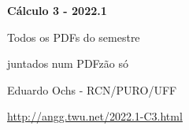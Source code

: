 \documentclass[oneside,12pt]{article}
\begin{document}

\def\u#1{\par{\footnotesize \url{#1}}}

\def\drafturl{http://angg.twu.net/LATEX/2022-1-C3.pdf}
\def\drafturl{http://angg.twu.net/2022.1-C3.html}
\def\draftfooter{\tiny \href{\drafturl}{\jobname{}} \ColorBrown{\shorttoday{} \hours}}



%

\thispagestyle{empty}

\begin{center}

\vspace*{1.2cm}

{\bf \Large Cálculo 3 - 2022.1}

\bsk

Todos os PDFs do semestre

juntados num PDFzão só

\bsk

Eduardo Ochs - RCN/PURO/UFF

\url{http://angg.twu.net/2022.1-C3.html}

\end{center}

\newpage

\def\incl#1{}


\incl{2022-1-C3-orbita}

\incl{2022-1-C3-notacao-de-fisicos}

\incl{2022-1-C3-MT1}

\incl{2022-1-C3-funcoes-homogeneas}

\incl{2022-1-C3-MT2}

\incl{2022-1-C3-P1}

\incl{2022-1-C3-P2}

\incl{2022-1-C3-VR}

\incl{2022-1-C3-VS}

\incl{2022-1-C3-VSB}




\end{document}
